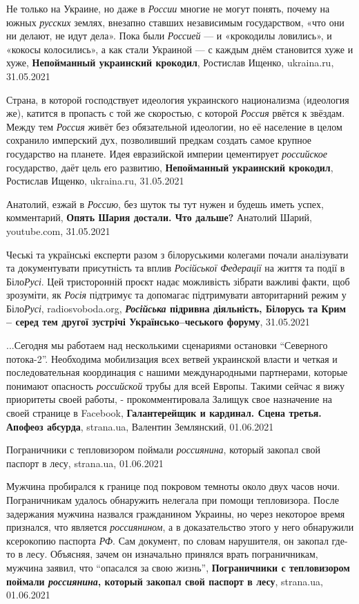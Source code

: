 Не только на Украине, но даже в \emph{России} многие не могут понять, почему на южных
\emph{русских} землях, внезапно ставших независимым государством, «что они ни делают,
не идут дела». Пока были \emph{Россией} — и «крокодилы ловились», и «кокосы
колосились», а как стали Украиной — с каждым днём становится хуже и хуже,
\textbf{Непойманный украинский крокодил}, Ростислав Ищенко, ukraina.ru, 31.05.2021

Страна, в которой господствует идеология украинского национализма (идеология
же), катится в пропасть с той же скоростью, с которой \emph{Россия} рвётся к
звёздам.  Между тем \emph{Россия} живёт без обязательной идеологии, но её
население в целом сохранило имперский дух, позволивший предкам создать самое
крупное государство на планете. Идея евразийской империи цементирует
\emph{российское} государство, даёт цель его развитию, 
\textbf{Непойманный украинский крокодил}, Ростислав Ищенко, ukraina.ru, 31.05.2021

Анатолий, езжай в \emph{Россию}, без шуток ты тут нужен и будешь иметь успех,
комментарий, \textbf{Опять Шария достали. Что дальше?} Анатолий Шарий, youtube.com, 31.05.2021

Чеські та українські експерти разом з білоруськими колегами почали аналізувати
та документувати присутність та вплив \emph{Російської Федерації} на життя та події в
Біло\emph{Русі}. Цей тристоронній проєкт надає можливість зібрати важливі факти, щоб
зрозуміти, як \emph{Росія} підтримує та допомагає підтримувати авторитарний режим у
Біло\emph{Русі},
radiosvoboda.org, \textbf{\emph{Російська} підривна діяльність, Білорусь та Крим –
серед тем другої зустрічі Українсько–чеського форуму}, 31.05.2021

...Сегодня мы работаем над несколькими сценариями остановки \enquote{Северного
потока-2}.  Необходима мобилизация всех ветвей украинской власти и четкая и
последовательная координация с нашими международными партнерами, которые
понимают опасность \emph{российской} трубы для всей Европы. Такими сейчас я
вижу приоритеты своей работы, - прокомментировала Залищук свое назначение на
своей странице в Facebook, 
\textbf{Галантерейщик и кардинал. Сцена третья. Апофеоз абсурда}, strana.ua, Валентин Землянский, 01.06.2021

Пограничники с тепловизором поймали \emph{россиянина}, который закопал свой
паспорт в лесу, strana.ua, 01.06.2021

Мужчина пробирался к границе под покровом темноты около двух часов ночи.
Пограничникам удалось обнаружить нелегала при помощи тепловизора.  После
задержания мужчина назвался гражданином Украины, но через некоторое время
признался, что является \emph{россиянином}, а в доказательство этого у него
обнаружили ксерокопию паспорта \emph{РФ}. Сам документ, по словам нарушителя,
он закопал где-то в лесу. Объясняя, зачем он изначально принялся врать
пограничникам, мужчина заявил, что \enquote{опасался за свою жизнь},
\textbf{Пограничники с тепловизором поймали \emph{россиянина}, который закопал
свой паспорт в лесу}, strana.ua, 01.06.2021

